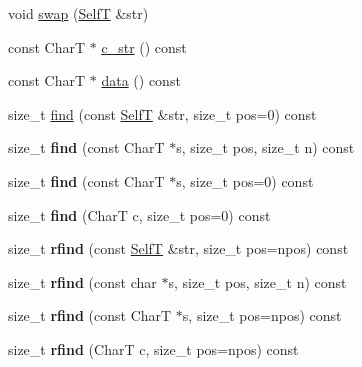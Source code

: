 \begin{CompactItemize}
\item 
void \hyperlink{classbbt__string_04e661fd40f8134bff1b427e08603786}{swap} (\hyperlink{classbbt__string}{SelfT} \&str)
\item 
const CharT $\ast$ \hyperlink{classbbt__string_c153fa7ac5477ba7ef44c684cb396c0b}{c\_\-str} () const 
\item 
const CharT $\ast$ \hyperlink{classbbt__string_bd225f98ab68e2385b6d3e23bd4719cb}{data} () const 
\item 
size\_\-t \hyperlink{classbbt__string_d4e8abb583695fb2be91eaee21827601}{find} (const \hyperlink{classbbt__string}{SelfT} \&str, size\_\-t pos=0) const 
\item 
\hypertarget{classbbt__string_ae10cac797e5601d7300af19f0b90407}{
size\_\-t \textbf{find} (const CharT $\ast$s, size\_\-t pos, size\_\-t n) const }
\label{classbbt__string_ae10cac797e5601d7300af19f0b90407}

\item 
\hypertarget{classbbt__string_845e09e0a102277a233106c0b0920703}{
size\_\-t \textbf{find} (const CharT $\ast$s, size\_\-t pos=0) const }
\label{classbbt__string_845e09e0a102277a233106c0b0920703}

\item 
\hypertarget{classbbt__string_a631cb3200714f67f6f9bb8630b3e4c1}{
size\_\-t \textbf{find} (CharT c, size\_\-t pos=0) const }
\label{classbbt__string_a631cb3200714f67f6f9bb8630b3e4c1}

\item 
\hypertarget{classbbt__string_e9266d980b861118c6996014dadaeafe}{
size\_\-t \textbf{rfind} (const \hyperlink{classbbt__string}{SelfT} \&str, size\_\-t pos=npos) const }
\label{classbbt__string_e9266d980b861118c6996014dadaeafe}

\item 
\hypertarget{classbbt__string_d728504c413696593dd1e32563a81e4e}{
size\_\-t \textbf{rfind} (const char $\ast$s, size\_\-t pos, size\_\-t n) const }
\label{classbbt__string_d728504c413696593dd1e32563a81e4e}

\item 
\hypertarget{classbbt__string_59a26cb95fe7902c9698d48c3178edcd}{
size\_\-t \textbf{rfind} (const CharT $\ast$s, size\_\-t pos=npos) const }
\label{classbbt__string_59a26cb95fe7902c9698d48c3178edcd}

\item 
\hypertarget{classbbt__string_d62f1c73b1c760dca1b981d1a7b02a63}{
size\_\-t \textbf{rfind} (CharT c, size\_\-t pos=npos) const }
\label{classbbt__string_d62f1c73b1c760dca1b981d1a7b02a63}


\end{CompactItemize}
